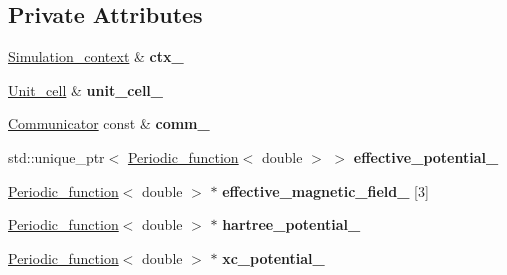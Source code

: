 \subsection*{Private Attributes}
\begin{DoxyCompactItemize}
\item 
\hypertarget{classsirius_1_1_potential_a107236a8e284b239b9a888587aa5bd53}{}\hyperlink{classsirius_1_1_simulation__context}{Simulation\+\_\+context} \& {\bfseries ctx\+\_\+}\label{classsirius_1_1_potential_a107236a8e284b239b9a888587aa5bd53}

\item 
\hypertarget{classsirius_1_1_potential_aa94f0458ddf8c127759e0b73de16acc6}{}\hyperlink{classsirius_1_1_unit__cell}{Unit\+\_\+cell} \& {\bfseries unit\+\_\+cell\+\_\+}\label{classsirius_1_1_potential_aa94f0458ddf8c127759e0b73de16acc6}

\item 
\hypertarget{classsirius_1_1_potential_a1aa716bb6ae5c3b5ca6ae44b262fac94}{}\hyperlink{classsddk_1_1_communicator}{Communicator} const \& {\bfseries comm\+\_\+}\label{classsirius_1_1_potential_a1aa716bb6ae5c3b5ca6ae44b262fac94}

\item 
\hypertarget{classsirius_1_1_potential_a425f6b348a9f68d5c1d0111db8cba503}{}std\+::unique\+\_\+ptr$<$ \hyperlink{classsirius_1_1_periodic__function}{Periodic\+\_\+function}$<$ double $>$ $>$ {\bfseries effective\+\_\+potential\+\_\+}\label{classsirius_1_1_potential_a425f6b348a9f68d5c1d0111db8cba503}

\item 
\hypertarget{classsirius_1_1_potential_a1e7f3670059c6058606df29b3de45bd6}{}\hyperlink{classsirius_1_1_periodic__function}{Periodic\+\_\+function}$<$ double $>$ $\ast$ {\bfseries effective\+\_\+magnetic\+\_\+field\+\_\+} \mbox{[}3\mbox{]}\label{classsirius_1_1_potential_a1e7f3670059c6058606df29b3de45bd6}

\item 
\hypertarget{classsirius_1_1_potential_a284e8ab6cc17f161da074086e1f081e1}{}\hyperlink{classsirius_1_1_periodic__function}{Periodic\+\_\+function}$<$ double $>$ $\ast$ {\bfseries hartree\+\_\+potential\+\_\+}\label{classsirius_1_1_potential_a284e8ab6cc17f161da074086e1f081e1}

\item 
\hypertarget{classsirius_1_1_potential_a20dca9a8eaedcc61f700cdeb3ffb44bd}{}\hyperlink{classsirius_1_1_periodic__function}{Periodic\+\_\+function}$<$ double $>$ $\ast$ {\bfseries xc\+\_\+potential\+\_\+}\label{classsirius_1_1_potential_a20dca9a8eaedcc61f700cdeb3ffb44bd}


\end{DoxyCompactItemize}
